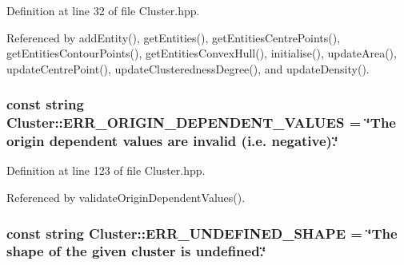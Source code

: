 Definition at line 32 of file Cluster.\-hpp.



Referenced by add\-Entity(), get\-Entities(), get\-Entities\-Centre\-Points(), get\-Entities\-Contour\-Points(), get\-Entities\-Convex\-Hull(), initialise(), update\-Area(), update\-Centre\-Point(), update\-Clusteredness\-Degree(), and update\-Density().

\hypertarget{classmultiscale_1_1analysis_1_1Cluster_a0fa38fcc3f00730409400578829cddd8}{
\subsubsection[{E\-R\-R\-\_\-\-O\-R\-I\-G\-I\-N\-\_\-\-D\-E\-P\-E\-N\-D\-E\-N\-T\-\_\-\-V\-A\-L\-U\-E\-S}]{\setlength{\rightskip}{0pt plus 5cm}const string Cluster\-::\-E\-R\-R\-\_\-\-O\-R\-I\-G\-I\-N\-\_\-\-D\-E\-P\-E\-N\-D\-E\-N\-T\-\_\-\-V\-A\-L\-U\-E\-S = \char`\"{}The origin dependent values are invalid (i.\-e. negative).\char`\"{}\hspace{0.3cm}{\ttfamily [static]}}}\label{classmultiscale_1_1analysis_1_1Cluster_a0fa38fcc3f00730409400578829cddd8}


Definition at line 123 of file Cluster.\-hpp.



Referenced by validate\-Origin\-Dependent\-Values().

\hypertarget{classmultiscale_1_1analysis_1_1Cluster_a546b8e93e3f1ef51a9932f8599639070}{
\subsubsection[{E\-R\-R\-\_\-\-U\-N\-D\-E\-F\-I\-N\-E\-D\-\_\-\-S\-H\-A\-P\-E}]{\setlength{\rightskip}{0pt plus 5cm}const string Cluster\-::\-E\-R\-R\-\_\-\-U\-N\-D\-E\-F\-I\-N\-E\-D\-\_\-\-S\-H\-A\-P\-E = \char`\"{}The {\bf shape} of the given cluster is undefined.\char`\"{}\hspace{0.3cm}{\ttfamily [static]}}}\label{classmultiscale_1_1analysis_1_1Cluster_a546b8e93e3f1ef51a9932f8599639070}


